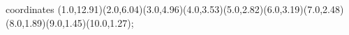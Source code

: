 					coordinates { (1.0,12.91)(2.0,6.04)(3.0,4.96)(4.0,3.53)(5.0,2.82)(6.0,3.19)(7.0,2.48)(8.0,1.89)(9.0,1.45)(10.0,1.27)};